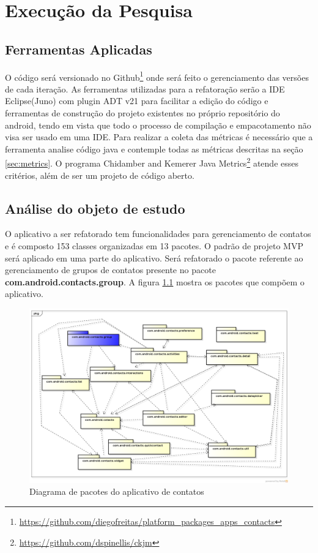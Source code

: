 \chapter{Execução da Pesquisa}


\section{Ferramentas Aplicadas}

O código será versionado no
Github\footnote{\url{https://github.com/diegofreitas/platform_packages_apps_contacts}}
onde será feito o gerenciamento das versões de cada iteração.
As ferramentas utilizadas para a refatoração serão a IDE Eclipse(Juno) com
plugin ADT v21 para facilitar a edição do código e ferramentas de construção
do projeto existentes no próprio repositório do android, tendo em vista que todo
o processo de compilação e empacotamento não visa ser usado em uma IDE.
Para realizar a coleta das métricas é necessário que a ferramenta analise código
java e contemple todas as métricas descritas na seção \ref{sec:metrics}. O
programa Chidamber and Kemerer Java
Metrics\footnote{\url{https://github.com/dspinellis/ckjm}} atende esses
critérios, além de ser um projeto de código aberto.

\section{Análise do objeto de estudo}

O aplicativo a ser refatorado tem funcionalidades para gerenciamento de
contatos e é composto 153 classes organizadas em 13 pacotes. O padrão
de projeto MVP será aplicado em uma parte do aplicativo. Será refatorado o
pacote referente ao gerenciamento de grupos de contatos presente no pacote
\textbf{com.android.contacts.group}. A figura \ref{fig:pacotes_contacts}
mostra os pacotes que compõem o aplicativo.

\begin{figure}[!h]
	\centering
	\includegraphics[scale=0.53,angle=90]{img/pacotes_contacts}
	\caption{Diagrama de pacotes do aplicativo de contatos} 
	\label{fig:pacotes_contacts}
\end{figure}


